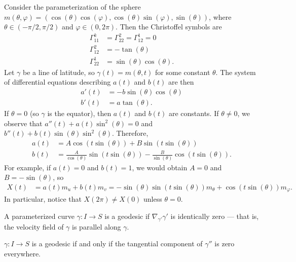 \begin{exmp}
    Consider the parameterization of the sphere $m(\theta, \varphi) = (\cos(\theta)\cos(\varphi), \cos(\theta)\sin(\varphi), \sin(\theta))$, where $\theta \in (-\pi/2, \pi/2)$ and $\varphi \in (0, 2\pi)$. Then the Christoffel symbols are
    \begin{align*}
        \Gamma_{11}^{k} &= \Gamma_{22}^{2} = \Gamma_{12}^{1} = 0 \\
        \Gamma_{12}^{2} &= -\tan(\theta) \\
        \Gamma_{22}^{1} &= \sin(\theta)\cos(\theta).
    \end{align*}
    Let $\gamma$ be a line of latitude, so $\gamma(t) = m(\theta, t)$ for some constant $\theta$. The system of differential equations describing $a(t)$ and $b(t)$ are then
    \begin{align*}
        a'(t) &= -b\sin(\theta)\cos(\theta) \\
        b'(t) &= a\tan(\theta).
    \end{align*}
    If $\theta = 0$ (so $\gamma$ is the equator), then $a(t)$ and $b(t)$ are constants. If $\theta \neq 0$, we observe that $a''(t) + a(t)\sin^2(\theta) = 0$ and $b''(t) + b(t)\sin(\theta)\sin^2(\theta)$. Therefore,
    \begin{align*}
        a(t) &= A\cos(t\sin(\theta)) + B\sin(t\sin(\theta)) \\
        b(t) &= \frac{A}{\cos(\theta)}\sin(t\sin(\theta)) -\frac{B}{\sin(\theta)}\cos(t\sin(\theta)).
    \end{align*}
    For example, if $a(t) = 0$ and $b(t) = 1$, we would obtain $A = 0$ and $B = -\sin(\theta)$, so
    \begin{align*}
        X(t) &= a(t)m_u + b(t)m_v = -\sin(\theta)\sin(t\sin(\theta))m_{\theta} + \cos(t\sin(\theta))m_{\varphi}.
    \end{align*}
    In particular, notice that $X(2\pi) \neq X(0)$ unless $\theta = 0$.
\end{exmp}

\begin{defn}
    A parameterized curve $\gamma: I \to S$ is a geodesic if $\nabla_{\gamma'}\gamma'$ is identically zero --- that is, the velocity field of $\gamma$ is parallel along $\gamma$.
\end{defn}

\begin{prop}\label{prop:geodesic-iff-no-tangential-acceleration}
    $\gamma: I \to S$ is a geodesic if and only if the tangential component of $\gamma''$ is zero everywhere.
\end{prop}

